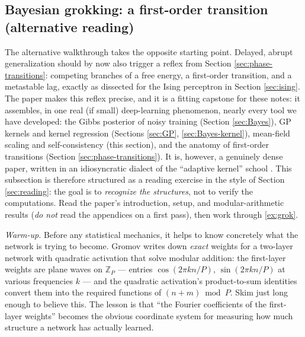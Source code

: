\documentclass[11pt]{article}
\begin{document}
\subsection{Bayesian grokking: a first-order transition (alternative reading)}
\label{sec:grok}

The alternative walkthrough takes the opposite starting point. Delayed, abrupt generalization should by now also trigger a reflex from Section \ref{sec:phase-transitions}: competing branches of a free energy, a first-order transition, and a metastable lag, exactly as dissected for the Ising perceptron in Section \ref{sec:ising}. The paper \cite{rubin2024grokking} makes this reflex precise, and it is a fitting capstone for these notes: it assembles, in one real (if small) deep-learning phenomenon, nearly every tool we have developed: the Gibbs posterior of noisy training (Section \ref{sec:Bayes}), GP kernels and kernel regression (Sections \ref{sec:GP}, \ref{sec:Bayes-kernel}), mean-field scaling and self-consistency (this section), and the anatomy of first-order transitions (Section \ref{sec:phase-transitions}). It is, however, a genuinely dense paper, written in an idiosyncratic dialect of the ``adaptive kernel'' school \cite{seroussi2023separation}. This subsection is therefore structured as a reading exercise in the style of Section \ref{sec:reading}: the goal is to \emph{recognize the structures}, not to verify the computations. Read the paper's introduction, setup, and modular-arithmetic results (\emph{do not} read the appendices on a first pass), then work through \cref{ex:grok}.

\emph{Warm-up.} Before any statistical mechanics, it helps to know concretely what the network is trying to become. Gromov \cite{gromov2023grokking} writes down \emph{exact} weights for a two-layer network with quadratic activation that solve modular addition: the first-layer weights are plane waves on $\mathbb{Z}_P$ --- entries $\cos(2\pi k n/P)$, $\sin(2\pi k n/P)$ at various frequencies $k$ --- and the quadratic activation's product-to-sum identities convert them into the required functions of $(n+m) \bmod P$. Skim \cite{gromov2023grokking} just long enough to believe this. The lesson is that ``the Fourier coefficients of the first-layer weights'' becomes the obvious coordinate system for measuring how much structure a network has actually learned.
\end{document}
